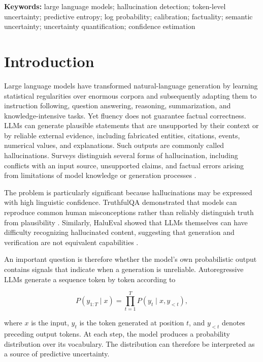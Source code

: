\documentclass[11pt]{article}
\begin{document}
\noindent\textbf{Keywords:}
large language models; hallucination detection; token-level uncertainty;
predictive entropy; log probability; calibration; factuality;
semantic uncertainty; uncertainty quantification; confidence estimation

\section{Introduction}
\label{sec:introduction}

Large language models have transformed natural-language generation by learning statistical regularities over enormous corpora and subsequently adapting them to instruction following, question answering, reasoning, summarization, and knowledge-intensive tasks. Yet fluency does not guarantee factual correctness. LLMs can generate plausible statements that are unsupported by their context or by reliable external evidence, including fabricated entities, citations, events, numerical values, and explanations. Such outputs are commonly called hallucinations. Surveys distinguish several forms of hallucination, including conflicts with an input source, unsupported claims, and factual errors arising from limitations of model knowledge or generation processes \cite{huang2024}.

The problem is particularly significant because hallucinations may be expressed with high linguistic confidence. TruthfulQA demonstrated that models can reproduce common human misconceptions rather than reliably distinguish truth from plausibility \cite{lin2022}. Similarly, HaluEval showed that LLMs themselves can have difficulty recognizing hallucinated content, suggesting that generation and verification are not equivalent capabilities \cite{li2023}.

An important question is therefore whether the model's own probabilistic output contains signals that indicate when a generation is unreliable. Autoregressive LLMs generate a sequence token by token according to

\begin{equation}
P(y_{1:T}\mid x)
=
\prod_{t=1}^{T}
P(y_t\mid x,y_{<t}),
\label{eq:sequence-probability}
\end{equation}

where $x$ is the input, $y_t$ is the token generated at position $t$, and $y_{<t}$ denotes preceding output tokens. At each step, the model produces a probability distribution over its vocabulary. The distribution can therefore be interpreted as a source of predictive uncertainty.
\end{document}
